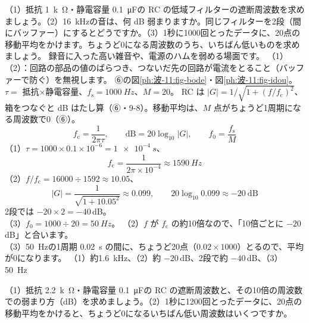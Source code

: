 \label{ph:波-11:ex8}
\begin{phreidai}[RC のフィルターと移動平均]
（1）抵抗 \qty{1}{k\ohm}・静電容量 \qty{0.1}{\micro F}の RC の低域フィルターの遮断周波数を求めましょう。（2）\qty{16}{kHz}の音は、何 dB 弱まりますか。同じフィルターを2段（間にバッファー）にするとどうですか。（3）1秒に1000回とったデータに、20点の移動平均をかけます。ちょうど0になる周波数のうち、いちばん低いものを求めましょう。
\phbamen
録音に入った高い雑音や、電源のハムを弱める場面です。
\phmushi
（1）（2）：回路の部品の値のばらつき、つないだ先の回路が電流をとること（バッファーで防ぐ）を無視します。
\phzu
⑥の図\ref{ph:波-11:fig-bode}・図\ref{ph:波-11:fig-idou}。$\tau=$ 抵抗×静電容量、$f_{\mathrm s}=\qty{1000}{Hz}$、$M=20$。
\phriyu
RC は $|G|=1/\sqrt{1+(f/f_{\mathrm c})^2}$、箱をつなぐと dB はたし算（⑥・9-8）。移動平均は、$M$ 点がちょうど1周期になる周波数で0（⑥）。
\phtateru
\[f_{\mathrm c}=\frac{1}{2\pi\tau},\qquad\text{dB}=20\log_{10}|G|,\qquad f_0=\frac{f_{\mathrm s}}{M}\]
\phtoku
（1）$\tau=1000\times0.1\times10^{-6}=\qty{1e-4}{s}$、\[f_{\mathrm c}=\frac{1}{2\pi\times10^{-4}}\approx\qty{1590}{Hz}\]
（2）$f/f_{\mathrm c}=16000\div1592\approx10.05$、\[|G|=\frac{1}{\sqrt{1+10.05^2}}\approx0.099,\qquad20\log_{10}0.099\approx-20\ \text{dB}\]
2段では $-20\times2=-40$\,dB。\\
（3）$f_0=1000\div20=\qty{50}{Hz}$。
\phtashikame
（2）$f$ が $f_{\mathrm c}$ の約10倍なので、「10倍ごとに $-20$\,dB」と合います。\\
（3）\qty{50}{Hz}の1周期 \qty{0.02}{s} の間に、ちょうど20点（$0.02\times1000$）とるので、平均が0になります。
\kotae （1）約\qty{1.6}{kHz}、（2）約 $-20$\,dB、2段で約 $-40$\,dB、（3）\qty{50}{Hz}
\end{phreidai}
\begin{jibun}
（1）抵抗 \qty{2.2}{k\ohm}・静電容量 \qty{0.1}{\micro F}の RC の遮断周波数と、その10倍の周波数での弱まり方（dB）を求めましょう。（2）1秒に1200回とったデータに、20点の移動平均をかけると、ちょうど0になるいちばん低い周波数はいくつですか。
\end{jibun}

